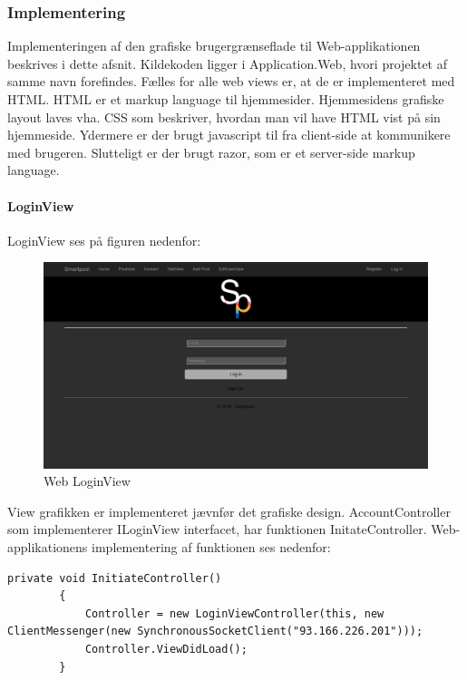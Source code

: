 \subsubsection{Implementering}
Implementeringen af den grafiske brugergrænseflade til Web-applikationen beskrives i dette afsnit. Kildekoden ligger i Application.Web, hvori projektet af samme navn forefindes. Fælles for alle web views er, at de er implementeret med HTML. HTML er et markup language til hjemmesider. Hjemmesidens grafiske layout laves vha. CSS som beskriver, hvordan man vil have HTML vist på sin hjemmeside. Ydermere er der brugt javascript til fra client-side at kommunikere med brugeren. Slutteligt er der brugt razor, som er et server-side markup language. 

\paragraph{LoginView}
LoginView ses på figuren nedenfor:

\begin{figure}
	\centering
	\includegraphics[width=1.0\linewidth]{figs/implementering/web_login}
	\caption{Web LoginView}
	\label{fig:webloginview}
\end{figure}

View grafikken er implementeret jævnfør det grafiske design. AccountController som implementerer ILoginView interfacet, har funktionen InitateController. Web-applikationens implementering af funktionen ses nedenfor:

\begin{lstlisting}[caption=InitiateController, label=code:InitaiteController]
private void InitiateController()
        {
            Controller = new LoginViewController(this, new ClientMessenger(new SynchronousSocketClient("93.166.226.201")));
            Controller.ViewDidLoad();
        }
\end{lstlisting} 

